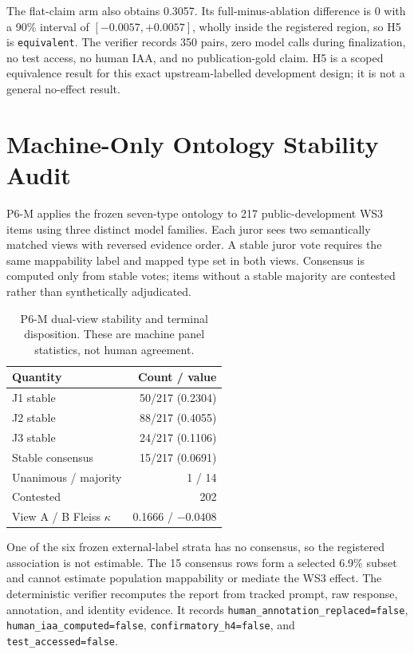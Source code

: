 The flat-claim arm also obtains 0.3057. Its full-minus-ablation difference is
0 with a 90\% interval of $[-0.0057,+0.0057]$, wholly inside the registered
region, so H5 is \texttt{equivalent}. The verifier records 350 pairs, zero
model calls during finalization, no test access, no human IAA, and no
publication-gold claim. H5 is a scoped equivalence result for this exact
upstream-labelled development design; it is not a general no-effect result.

\section{Machine-Only Ontology Stability Audit}
\label{app:p6m}

P6-M applies the frozen seven-type ontology to 217 public-development WS3
items using three distinct model families. Each juror sees two semantically
matched views with reversed evidence order. A stable juror vote requires the
same mappability label and mapped type set in both views. Consensus is computed
only from stable votes; items without a stable majority are contested rather
than synthetically adjudicated.

\begin{table}[h]
\caption{P6-M dual-view stability and terminal disposition. These are machine
panel statistics, not human agreement.}
\label{tab:p6m-stability}
\begin{center}
\small
\begin{tabular}{lr}
\toprule
Quantity & Count / value \\
\midrule
J1 stable & 50/217 (0.2304) \\
J2 stable & 88/217 (0.4055) \\
J3 stable & 24/217 (0.1106) \\
Stable consensus & 15/217 (0.0691) \\
Unanimous / majority & 1 / 14 \\
Contested & 202 \\
View A / B Fleiss $\kappa$ & 0.1666 / $-0.0408$ \\
\bottomrule
\end{tabular}
\end{center}
\end{table}

One of the six frozen external-label strata has no consensus, so the registered
association is not estimable. The 15 consensus rows form a selected 6.9\%
subset and cannot estimate population mappability or mediate the WS3 effect.
The deterministic verifier recomputes the report from tracked prompt, raw
response, annotation, and identity evidence. It records
\texttt{human\_annotation\_replaced=false},
\texttt{human\_iaa\_computed=false},
\texttt{confirmatory\_h4=false}, and \texttt{test\_accessed=false}.

